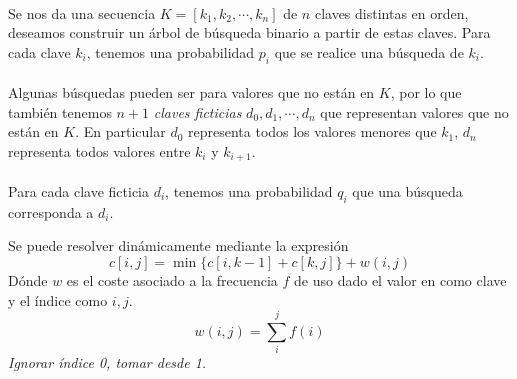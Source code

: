 \begin{definition}[Formalmente]~\\
	Se nos da una secuencia $K=[k_1,k_2,\cdots,k_n]$ de $n$ claves distintas en orden, deseamos construir un árbol de búsqueda binario a partir de estas claves. Para cada  clave $k_i$, tenemos una probabilidad $p_i$ que se realice una búsqueda de $k_i$.\\\\
	Algunas búsquedas pueden ser para valores que no están en $K$, por lo que también tenemos $n+1$ \textit{claves ficticias} $d_0,d_1,\cdots,d_n$ que representan valores que no están en $K$. En particular $d_0$ representa todos los valores menores que $k_1$, $d_n$ representa todos valores entre $k_i$ y $k_{i+1}$.\\\\
	Para cada clave ficticia $d_i$, tenemos una probabilidad $q_i$ que una búsqueda corresponda a $d_i$.
\end{definition}

\begin{theorem}
	Se puede resolver dinámicamente mediante la expresión
	$$ c[i,j]=\min\{c[i,k-1]+c[k,j] \}+w(i,j) $$
	Dónde $w$ es el coste asociado a la frecuencia $f$ de uso dado el valor en como clave y el índice como $i,j$.
	$$ w(i,j)=\sum_{i}^jf(i) $$
	\textit{Ignorar     índice 0, tomar desde 1.}
\end{theorem}
